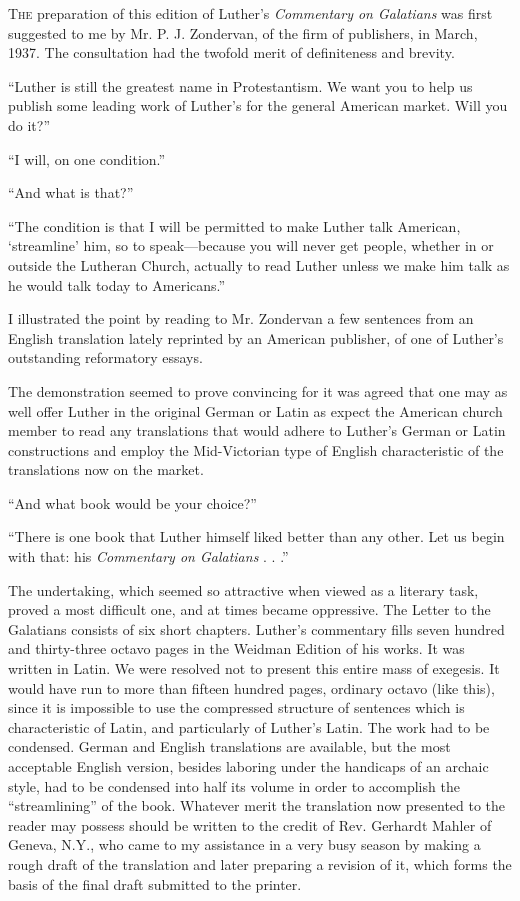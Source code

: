 
\textsc{The} preparation of this edition of Luther’s \emph{Commentary on Galatians} was first suggested to me by Mr. P. J. Zondervan, of the firm of publishers, in March, 1937. The consultation had the twofold merit of definiteness and brevity.

“Luther is still the greatest name in Protestantism. We want you to help us publish some leading work of Luther’s for the general American market. Will you do it?”

“I will, on one condition.”

“And what is that?”

“The condition is that I will be permitted to make Luther talk American, ‘streamline’ him, so to speak—because you will never get people, whether in or outside the Lutheran Church, actually to read Luther unless we make him talk as he would talk today to Americans.”

I illustrated the point by reading to Mr. Zondervan a few sentences from an English translation lately reprinted by an American publisher, of one of Luther’s outstanding reformatory essays.

The demonstration seemed to prove convincing for it was agreed that one may as well offer Luther in the original German or Latin as expect the American church member to read any translations that would adhere to Luther’s German or Latin constructions and employ the Mid-Victorian type of English characteristic of the translations now on the market.

“And what book would be your choice?”

“There is one book that Luther himself liked better than any other. Let us begin with that: his \emph{Commentary on Galatians} . . .”

The undertaking, which seemed so attractive when viewed as a literary task, proved a most difficult one, and at times became oppressive. The Letter to the Galatians consists of six short chapters. Luther’s commentary fills seven hundred and thirty-three octavo pages in the Weidman Edition of his works. It was written in Latin. We were resolved not to present this entire mass of exegesis. It would have run to more than fifteen hundred pages, ordinary octavo (like this), since it is impossible to use the compressed structure of sentences which is characteristic of Latin, and particularly of Luther’s Latin. The work had to be condensed. German and English translations are available, but the most acceptable English version, besides laboring under the handicaps of an archaic style, had to be condensed into half its volume in order to accomplish the “streamlining” of the book. Whatever merit the translation now presented to the reader may possess should be written to the credit of Rev. Gerhardt Mahler of Geneva, N.Y., who came to my assistance in a very busy season by making a rough draft of the translation and later preparing a revision of it, which forms the basis of the final draft submitted to the printer.

